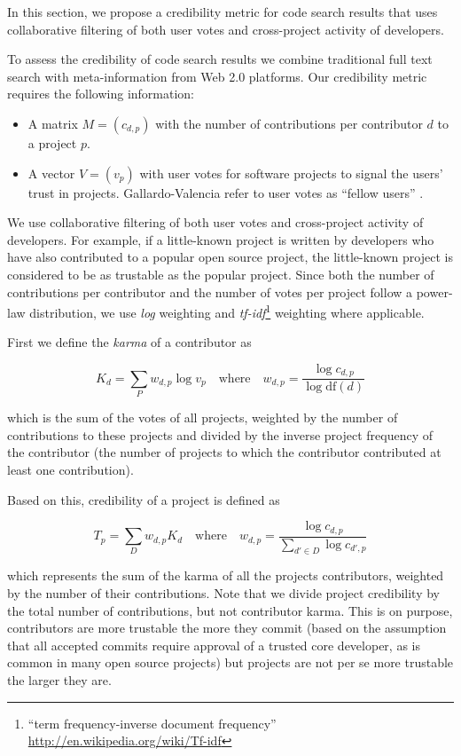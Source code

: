 In this section, we propose a credibility metric for code search results that uses collaborative filtering of both user votes and cross-project activity of developers.

To assess the credibility of code search results we combine traditional full text search with meta-information from Web 2.0 platforms. Our credibility metric requires the following information:

\begin{itemize}
\item A matrix $M = (c_{d,p})$ with the number of contributions per contributor $d$ to a project $p$.
\item A vector $V = (v_p)$ with user votes for software projects to signal the users' trust in projects. Gallardo-Valencia \etal refer to user votes as ``fellow users'' \cite{Gall09a}.
\end{itemize}

We use collaborative filtering of both user votes and cross-project activity of developers. For example, if a little-known project is written by developers who have also contributed to a popular open source project, the little-known project is considered to be as trustable as the popular project. Since both the number of contributions per contributor and the number of votes per project follow a power-law distribution, we use \emph{log} weighting and \emph{tf-idf}\footnote{``term frequency-inverse document frequency'' \url{http://en.wikipedia.org/wiki/Tf-idf}} weighting where applicable. 

First we define the \emph{karma} of a contributor as

    $$K_{d} = \sum_{P} w_{d,p} \log v_p
    \quad \mathrm{where} \quad 
    w_{d,p} = \frac{\log c_{d,p}}{\log \mathrm{df}(d)}$$

\noindent
which is the sum of the votes of all projects, weighted by the number of contributions to these projects and divided by the inverse project frequency of the contributor (\ie the number of projects to which the contributor contributed at least one contribution).


Based on this, credibility of a project is defined as 

	$$T_{p} = \sum_{D} w_{d,p} K_d
	\quad \mathrm{where} \quad 
	w_{d,p} = \frac{\log c_{d,p}}{\sum_{d' \in D} \log c_{d',p}}$$

\noindent
which represents the sum of the karma of all the projects contributors, weighted by the number of their contributions.
Note that we divide project credibility by the total number of contributions, but not contributor karma. This is on purpose, contributors are more trustable the more they commit (based on the assumption that all accepted commits require approval of a trusted core developer, as is common in many open source projects) but projects are not per se more trustable the larger they are.

